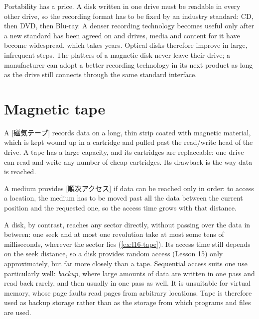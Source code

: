 \documentclass[../main.tex]{subfiles}
\begin{document}
Portability has a price.  A disk written in one drive must be readable in
every other drive, so the recording format has to be fixed by an industry
standard: CD, then DVD, then Blu-ray.  A denser recording technology becomes
useful only after a new standard has been agreed on and drives, media and
content for it have become widespread, which takes years.  Optical disks
therefore improve in large, infrequent steps.  The platters of a magnetic
disk never leave their drive; a manufacturer can adopt a better recording
technology in its next product as long as the drive still connects through
the same standard interface.

\section{Magnetic tape}
\label{sec:l16-tape}

A [磁気テープ] records data on a long, thin strip
coated with magnetic material, which is kept wound up in a cartridge and
pulled past the read/write head of the drive.  A tape has a large capacity, and its cartridges are replaceable: one
drive can read and write any number of cheap cartridges.  Its drawback is
the way data is reached.

\begin{definition}
  A medium provides [順次アクセス] if data can be
  reached only in order: to access a location, the medium has to be moved
  past all the data between the current position and the requested one, so
  the access time grows with that distance.
\end{definition}

A disk, by contrast, reaches any sector directly, without passing over the
data in between: one seek and at most one revolution take at most some tens
of milliseconds, wherever the sector lies (\cref{ex:l16-tape}).  Its access
time still depends on the seek distance, so a disk provides random access
(Lesson 15) only approximately, but far more closely than a tape.  Sequential
access suits one use particularly well: \emph{backup}, where large amounts of
data are written in one pass and read back rarely, and then usually in one
pass as well.
It is unsuitable for virtual memory, whose page faults read
pages from arbitrary locations.  Tape is therefore used as backup storage
rather than as the storage from which programs and files are used.
\end{document}
